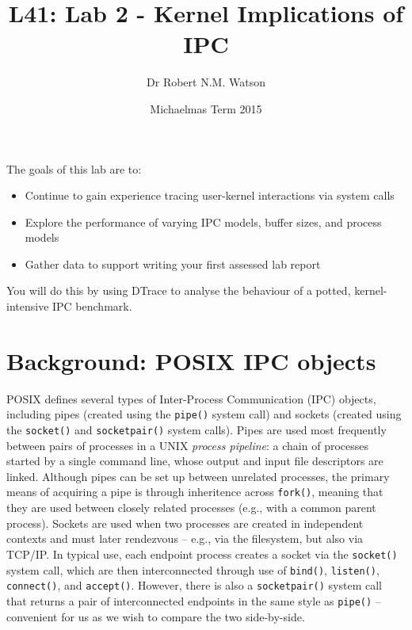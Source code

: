 \documentclass[a4paper,10pt]{article}
\begin{document}
\title{L41: Lab 2 - Kernel Implications of IPC}
\author{Dr Robert N.M. Watson}
\date{Michaelmas Term 2015}
\maketitle

%
%
%

\noindent
The goals of this lab are to:

\begin{itemize}
\item Continue to gain experience tracing user-kernel interactions via system calls
\item Explore the performance of varying IPC models, buffer sizes, and process models
\item Gather data to support writing your first assessed lab report
\end{itemize}

\noindent
You will do this by using DTrace to analyse the behaviour of a potted,
kernel-intensive IPC benchmark.

\section*{Background: POSIX IPC objects}

POSIX defines several types of Inter-Process Communication (IPC) objects,
including pipes (created using the \texttt{pipe()} system call) and sockets
(created using the \texttt{socket()} and \texttt{socketpair()} system calls).
Pipes are used most frequently between pairs of processes in a UNIX
\textit{process pipeline}: a chain of processes started by a single command
line, whose output and input file descriptors are linked.
Although pipes can be set up between unrelated processes, the primary means of
acquiring a pipe is through inheritence across \texttt{fork()}, meaning that
they are used between closely related processes (e.g., with a common parent
process).
Sockets are used when two processes are created in independent contexts and
must later rendezvous -- e.g., via the filesystem, but also via TCP/IP.
In typical use, each endpoint process creates a socket via the
\texttt{socket()} system call, which are then interconnected through use of
\texttt{bind()}, \texttt{listen()}, \texttt{connect()}, and \texttt{accept()}.
However, there is also a \texttt{socketpair()} system call that returns a pair
of interconnected endpoints in the same style as \texttt{pipe()} -- convenient
for us as we wish to compare the two side-by-side.
\end{document}
